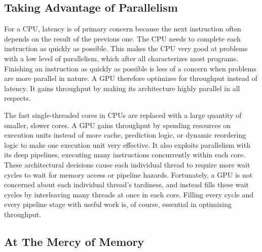\documentclass[../main/report.tex]{subfiles}
\begin{document}
\subsection{Taking Advantage of Parallelism}

For a CPU, latency is of primary concern because the next instruction often depends on the result of the previous one.
The CPU needs to complete each instruction as quickly as possible.
This makes the CPU very good at problems with a low level of parallelism, which after all characterizes most programs.
Finishing an instruction as quickly as possible is less of a concern when problems are more parallel in nature.
A GPU therefore optimizes for throughput instead of latency.
It gains throughput by making its architecture highly parallel in all respects.

The fast single-threaded cores in CPUs are replaced with a large quantity of smaller, slower cores.
A GPU gains throughput by spending resources on execution units instead of more cache, prediction logic, or dynamic reordering logic to make one execution unit very effective.
It also exploits parallelism with its deep pipelines, executing many instructions concurrently within each core.
These architectural decisions cause each individual thread to require more wait cycles to wait for memory access or pipeline hazards.
Fortunately, a GPU is not concerned about each individual thread's tardiness, and instead fills these wait cycles by interleaving many threads at once in each core.
Filling every cycle and every pipeline stage with useful work is, of course, essential in optimizing throughput.


\subsection{At The Mercy of Memory}


\end{document}
